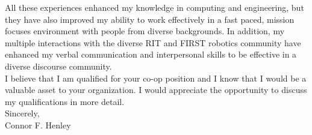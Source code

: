 \documentclass[line,margin]{res}
\begin{document}
\begin{resume}
\begin{adjustwidth}{-92pt}{0pt}
		\noindent
		All these experiences enhanced my knowledge in computing and engineering, but they have also improved my ability to work effectively in a fast paced, mission focuses environment with people from diverse backgrounds. In addition, my multiple interactions with the diverse RIT and FIRST robotics community have enhanced my verbal communication and interpersonal skills to be effective in a diverse discourse community. \\

		\noindent
		I believe that I am qualified for your co-op position and I know that I would be a valuable asset to your organization. I would appreciate the opportunity to discuss my qualifications in more detail. \\

		Sincerely, \\
		Connor F. Henley

		\end{adjustwidth}
	\end{resume}
\end{document}
